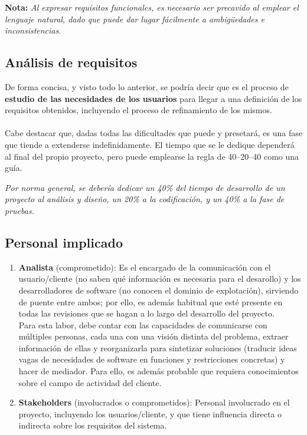 \textbf{Nota:} \textit{Al expresar requisitos funcionales, es necesario ser precavido al emplear el lenguaje natural, dado que puede dar lugar fácilmente a ambigüedades e inconsistencias.}

\subsection{Análisis de requisitos}

De forma concisa, y visto todo lo anterior, se podría decir que es el proceso de \textbf{estudio de las necesidades de los usuarios} para llegar a una definición de los requisitos obtenidos, incluyendo el proceso de refinamiento de los mismos.
\\\\
Cabe destacar que, dadas todas las dificultades que puede y presetará, es una fase que tiende a extenderse indefinidamente. El tiempo que se le dedique dependerá al final del propio proyecto, pero puede emplearse la regla de 40--20--40 como una guía.

\textit{Por norma general, se debería dedicar un 40\% del tiempo de desarrollo de un proyecto al análisis y diseño, un 20\% a la codificación, y un 40\% a la fase de pruebas.}

\subsection{Personal implicado}

\begin{enumerate}
    \item \textbf{Analista} (comprometido): Es el encargado de la comunicación con el usuario/cliente (no saben qué información es necesaria para el desarollo) y los desarrolladores de software (no conocen el dominio de explotación), sirviendo de puente entre ambos; por ello, es además habitual que esté presente en todas las revisiones que se hagan a lo largo del desarrollo del proyecto.\\
    Para esta labor, debe contar con las capacidades de comunicarse con múltiples personas, cada una con una visión distinta del problema, extraer información de ellas y reorganizarla para sintetizar soluciones (traducir ideas vagas de necesidades de software en funciones y restricciones concretas) y hacer de mediador. Para ello, es además probable que requiera conocimientos sobre el campo de actividad del cliente.

    \item \textbf{Stakeholders} (involucrados o comprometidos): Personal involucrado en el proyecto, incluyendo los usuarios/cliente, y que tiene influencia directa o indirecta sobre los requisitos del sistema.
\end{enumerate}


